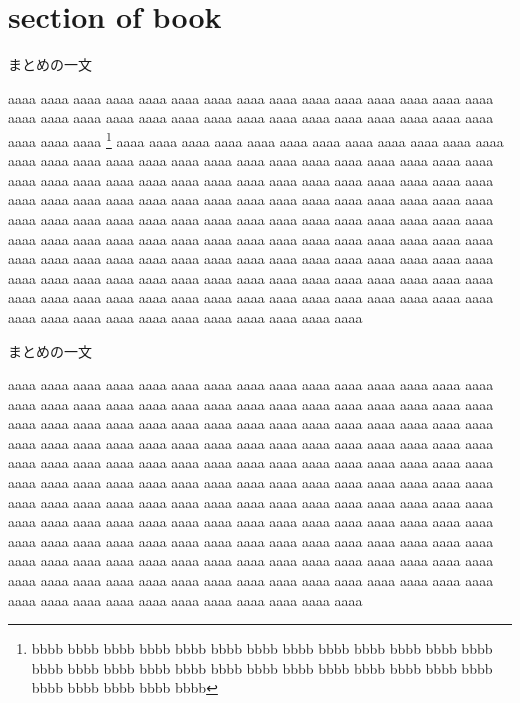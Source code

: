 \documentclass[10pt,dvipdfmx,landscape]{jsarticle}
\begin{document}
\section{section of book}
\begin{screen}
	まとめの一文
\end{screen}
%
aaaa aaaa aaaa aaaa aaaa aaaa aaaa aaaa aaaa aaaa aaaa 
aaaa aaaa aaaa aaaa aaaa aaaa aaaa aaaa aaaa aaaa aaaa 
aaaa aaaa aaaa aaaa aaaa aaaa aaaa aaaa aaaa aaaa aaaa 
\footnote{bbbb bbbb bbbb bbbb bbbb bbbb bbbb bbbb bbbb
bbbb bbbb bbbb bbbb bbbb bbbb bbbb bbbb bbbb bbbb bbbb 
bbbb bbbb bbbb bbbb bbbb bbbb bbbb bbbb bbbb bbbb bbbb} 
aaaa aaaa aaaa aaaa aaaa aaaa aaaa aaaa aaaa aaaa aaaa 
aaaa aaaa aaaa aaaa aaaa aaaa aaaa aaaa aaaa aaaa aaaa 
aaaa aaaa aaaa aaaa aaaa aaaa aaaa aaaa aaaa aaaa aaaa 
aaaa aaaa aaaa aaaa aaaa aaaa aaaa aaaa aaaa aaaa aaaa 
aaaa aaaa aaaa aaaa aaaa aaaa aaaa aaaa aaaa aaaa aaaa 
aaaa aaaa aaaa aaaa aaaa aaaa aaaa aaaa aaaa aaaa aaaa 
aaaa aaaa aaaa aaaa aaaa aaaa aaaa aaaa aaaa aaaa aaaa 
aaaa aaaa aaaa aaaa aaaa aaaa aaaa aaaa aaaa aaaa aaaa 
aaaa aaaa aaaa aaaa aaaa aaaa aaaa aaaa aaaa aaaa aaaa 
aaaa aaaa aaaa aaaa aaaa aaaa aaaa aaaa aaaa aaaa aaaa 
aaaa aaaa aaaa aaaa aaaa aaaa aaaa aaaa aaaa aaaa aaaa 
aaaa aaaa aaaa aaaa aaaa aaaa aaaa aaaa aaaa aaaa aaaa 
aaaa aaaa aaaa aaaa aaaa aaaa aaaa aaaa aaaa aaaa aaaa 
%
\newpage
\begin{screen}
	まとめの一文
\end{screen}
%
aaaa aaaa aaaa aaaa aaaa aaaa aaaa aaaa aaaa aaaa aaaa 
aaaa aaaa aaaa aaaa aaaa aaaa aaaa aaaa aaaa aaaa aaaa 
aaaa aaaa aaaa aaaa aaaa aaaa aaaa aaaa aaaa aaaa aaaa 
aaaa aaaa aaaa aaaa aaaa aaaa aaaa aaaa aaaa aaaa aaaa 
aaaa aaaa aaaa aaaa aaaa aaaa aaaa aaaa aaaa aaaa aaaa 
aaaa aaaa aaaa aaaa aaaa aaaa aaaa aaaa aaaa aaaa aaaa 
aaaa aaaa aaaa aaaa aaaa aaaa aaaa aaaa aaaa aaaa aaaa 
aaaa aaaa aaaa aaaa aaaa aaaa aaaa aaaa aaaa aaaa aaaa 
aaaa aaaa aaaa aaaa aaaa aaaa aaaa aaaa aaaa aaaa aaaa 
aaaa aaaa aaaa aaaa aaaa aaaa aaaa aaaa aaaa aaaa aaaa 
aaaa aaaa aaaa aaaa aaaa aaaa aaaa aaaa aaaa aaaa aaaa 
aaaa aaaa aaaa aaaa aaaa aaaa aaaa aaaa aaaa aaaa aaaa 
aaaa aaaa aaaa aaaa aaaa aaaa aaaa aaaa aaaa aaaa aaaa 
aaaa aaaa aaaa aaaa aaaa aaaa aaaa aaaa aaaa aaaa aaaa 
aaaa aaaa aaaa aaaa aaaa aaaa aaaa aaaa aaaa aaaa aaaa 
aaaa aaaa aaaa aaaa aaaa aaaa aaaa aaaa aaaa aaaa aaaa 
\end{document}

